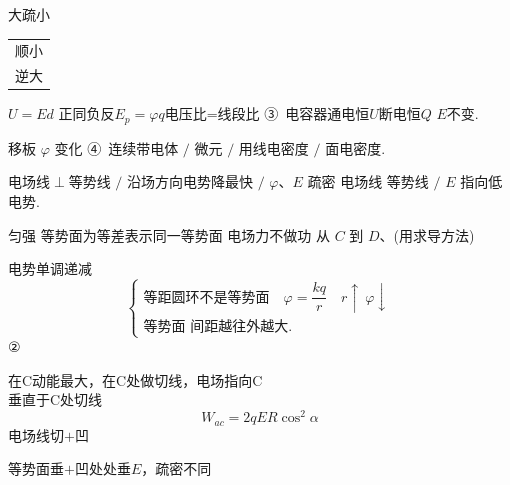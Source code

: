 大疏小\quad \begin{tabular}[t]{@{}l@{}}顺小\\逆大\end{tabular}\quad $U=Ed$ 正同负反\quad $E_{p}=\varphi q$\quad 电压比=线段比
③\ 电容器\quad 通电恒$U$\quad 断电恒$Q$ $E$不变.

移板 $\varphi$ 变化\quad
{}
\quad
{}
④\ 连续带电体 $/$ 微元 $/$ 用线电密度 $/$ 面电密度.

电场线$\perp$等势线 $/$ 沿场方向电势降最快 $/$ $\varphi$、$E$ 疏密 电场线 等势线 $/$ $E$ 指向低电势.

匀强 等势面为等差表示\qquad 同一等势面 电场力不做功
从 $C$ 到 $D$、(用求导方法)

电势单调递减
\[
\left\{\begin{array}{l}
\text{等距圆环不是等势面}\quad \varphi=\dfrac{kq}{r}\quad r\uparrow\ \varphi\downarrow\\[3ex]
\text{等势面 间距越往外越大.}
\end{array}\right.
\]
②

在C动能最大，在C处做切线，电场指向C\\
垂直于C处切线
\[ W_{ac}=2qER\cos^{2}\alpha \]
电场线\quad 切$+$凹

等势面\quad 垂$+$凹\quad 处处垂$E$，疏密不同


